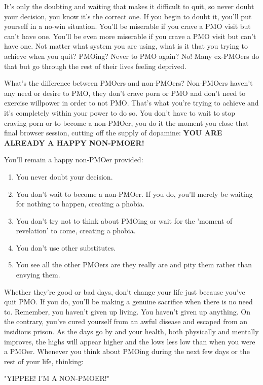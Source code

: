 \documentclass[easypeasy.tex]{subfiles}
\begin{document}
It's only the doubting and waiting that makes it difficult to quit, so never doubt your decision, you know it's the correct one. If you begin to doubt it, you'll put yourself in a no-win situation. You'll be miserable if you crave a PMO visit but can't have one. You'll be even more miserable if you crave a PMO visit but can't have one. Not matter what system you are using, what is it that you trying to achieve when you quit? PMOing? Never to PMO again? No! Many ex-PMOers do that but go through the rest of their lives feeling deprived.

What's the difference between PMOers and non-PMOers? Non-PMOers haven't any need or desire to PMO, they don't crave porn or PMO and don't need to exercise willpower in order to not PMO. That's what you're trying to achieve and it's completely within your power to do so. You don't have to wait to stop craving porn or to become a non-PMOer, you do it the moment you close that final browser session, cutting off the supply of dopamine: \textbf{YOU ARE ALREADY A HAPPY NON-PMOER!}

  You'll remain a happy non-PMOer provided:
\begin{enumerate}
  \item You never doubt your decision.
  \item You don't wait to become a non-PMOer. If you do, you'll merely be waiting for nothing to happen, creating a phobia.
  \item You don't try not to think about PMOing or wait for the 'moment of revelation' to come, creating a phobia.
  \item You don't use other substitutes.
  \item You see all the other PMOers are they really are and pity them rather than envying them.
\end{enumerate}
  
Whether they're good or bad days, don't change your life just because you've quit PMO. If you do, you'll be making a genuine sacrifice when there is no need to. Remember, you haven't given up living. You haven't given up anything. On the contrary, you've cured yourself from an awful disease and escaped from an insidious prison. As the days go by and your health, both physically and mentally improves, the highs will appear higher and the lows less low than when you were a PMOer. Whenever you think about PMOing during the next few days or the rest of your life, thinking:

{\Large "YIPPEE! I'M A NON-PMOER!"}
\end{document}
